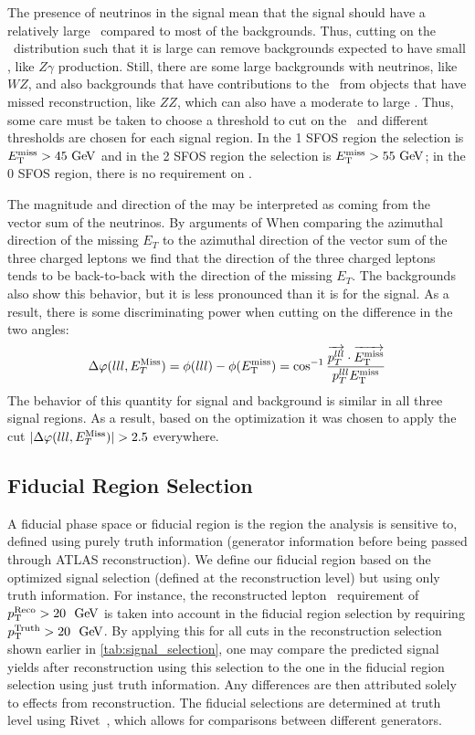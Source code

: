 The presence of neutrinos in the signal mean that the signal should have a 
relatively large \MET~compared to most of the backgrounds. Thus, 
cutting on the \MET~distribution such that it is large can remove backgrounds
expected to have small \MET, like $Z\gamma$ production.
Still, there are some large backgrounds with neutrinos, like $WZ$, 
and also backgrounds that have contributions to the \MET~from objects that have
missed reconstruction, like $ZZ$, which can also have a moderate to large \MET.
Thus, some care must be taken to choose a threshold to cut on the \MET~and
different thresholds are chosen for each signal 
region.
In the 1 SFOS region the selection is  $\MET > 45\GeV$
and in the 2 SFOS region the selection is $\MET > 55\GeV$;
in the 0 SFOS region, 
there is no requirement on \MET.

The magnitude and direction
of the \MET may be interpreted as coming from the 
vector sum of the neutrinos.  By arguments of 
When comparing the azimuthal direction 
of the missing $E_{T}$ to the azimuthal direction of the vector
sum of the three charged leptons
we find that 
the direction of the three charged leptons
tends to be back-to-back with the direction of the 
missing $E_{T}$. The
backgrounds also show this behavior, but it is less pronounced than 
it is for the signal.  As a result, 
there is some discriminating power when cutting on the difference 
in the two angles: 
\begin{equation}
\Delta\varphi(lll,E_{T}^{\textrm{Miss}}) = \phi(lll)-\phi(E_{\mathrm{T}}^{\mathrm{miss}}) = \cos^{-1}\frac{ \overrightarrow{p_{T}^{lll}}\cdot\overrightarrow{E_{\mathrm{T}}^{\mathrm{miss}}} }{ p_{T}^{lll}E_{\mathrm{T}}^{\mathrm{miss}} } 
\end{equation}
The behavior of this quantity for signal and
background is similar in all three signal regions.
As a result, based on the 
optimization it was chosen to apply the cut
$|\Delta\varphi(lll,E_{T}^{\textrm{Miss}})| > 2.5$ everywhere.  



\subsection{Fiducial Region Selection}
\label{sec:fiducial}

A fiducial phase space or fiducial region is the 
region the analysis is sensitive to, defined 
using purely truth information (generator information before
being passed through ATLAS reconstruction).
We define our fiducial region
based on the optimized signal selection (defined at the reconstruction level)
but using only truth information. For instance, the reconstructed
lepton \pt~requirement of 
$\pt^{\textrm{Reco}} > 20~\GeV$
is taken into account in the fiducial region selection
by requiring 
$\pt^{\textrm{Truth}} > 20~\GeV$.
By applying this for all cuts in the reconstruction selection
shown earlier in \tab\ref{tab:signal_selection},
one may compare the predicted signal yields after reconstruction
using this selection to the one in the fiducial region selection
using just truth information. Any differences are then attributed solely
to effects from reconstruction. 
The fiducial selections are determined at truth level 
using Rivet~\cite{Buckley:2010ar}, which allows for 
comparisons between different generators.


